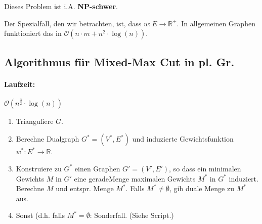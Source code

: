 \documentclass[a4paper,11pt]{report}
\begin{document}
Dieses Problem ist i.A. {\bf NP-schwer}.

Der Spezialfall, den wir betrachten, ist, dass $w : E \rightarrow \mathbb{R}^+$. In allgemeinen Graphen funktioniert das in $\mathcal{O}(n \cdot m + n^2 \cdot \log(n))$.


\subsection{Algorithmus für Mixed-Max Cut in pl. Gr.}
\paragraph{Laufzeit:} $\mathcal{O}(n^{\frac{3}{2}} \cdot \log(n))$

\begin{enumerate}
    \item Trianguliere $G$.
    \item Berechne Dualgraph $G^* = (V^*, E^*)$ und induzierte Gewichtsfunktion $w^* : E^* \rightarrow \mathbb{R}$.
    \item Konstruiere zu $G^*$ einen Graphen $G' = (V', E')$, so dass ein  minimalen Gewichts $M$ in $G'$ eine \gls{geradeMenge} maximalen Gewichts $M^*$ in $G^*$ induziert. Berechne $M$ und entspr. Menge $M^*$. Falls $M^* \neq \emptyset$, gib duale Menge zu $M^*$ aus.
    \item Sonst (d.h. falls $M^* = \emptyset$: Sonderfall. (Siehe Script.)
\end{enumerate}
\end{document}
